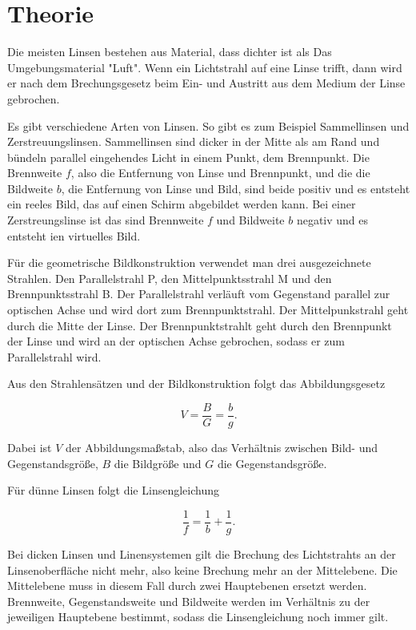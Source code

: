 \section{Theorie}
\label{sec:Theorie}

Die meisten Linsen bestehen aus Material, dass dichter ist als Das Umgebungsmaterial "Luft". Wenn ein Lichtstrahl auf eine Linse trifft, dann wird er nach dem Brechungsgesetz beim Ein- und Austritt aus dem Medium der Linse gebrochen. 

Es gibt verschiedene Arten von Linsen. So gibt es zum Beispiel Sammellinsen und Zerstreuungslinsen. Sammellinsen sind dicker in der Mitte als am Rand und bündeln parallel eingehendes Licht in einem Punkt, dem Brennpunkt. Die Brennweite $f$, also die Entfernung von Linse und Brennpunkt, und die die Bildweite $b$, die Entfernung von Linse und Bild, sind beide positiv und es entsteht ein reeles Bild, das auf einen Schirm abgebildet werden kann. Bei einer Zerstreungslinse ist das sind Brennweite $f$ und Bildweite $b$ negativ und es entsteht ien virtuelles Bild. 

Für die geometrische Bildkonstruktion verwendet man drei ausgezeichnete Strahlen. Den Parallelstrahl P, den Mittelpunktsstrahl M und den Brennpunktsstrahl B. 
Der Parallelstrahl verläuft vom Gegenstand parallel zur optischen Achse und wird dort zum Brennpunktstrahl. 
Der Mittelpunkstrahl geht durch die Mitte der Linse. 
Der Brennpunktstrahlt geht durch den Brennpunkt der Linse und wird an der optischen Achse gebrochen, sodass er zum Parallelstrahl wird. 

Aus den Strahlensätzen und der Bildkonstruktion folgt das Abbildungsgesetz 

\begin{equation}
    V = \frac{B}{G} = \frac{b}{g}.
    \label{eqn:abbildungsgesetz}
\end{equation}

Dabei ist $V$ der Abbildungsmaßstab, also das Verhältnis zwischen Bild- und Gegenstandsgröße, $B$ die Bildgröße und $G$ die Gegenstandsgröße.

Für dünne Linsen folgt die Linsengleichung 

\begin{equation}
    \frac{1}{f}= \frac{1}{b} + \frac{1}{g}.
    \label{eqn:linsengleichung}
\end{equation}

Bei dicken Linsen und Linensystemen gilt die Brechung des Lichtstrahts an der Linsenoberfläche nicht mehr, also keine Brechung mehr an der Mittelebene. Die Mittelebene muss in diesem Fall durch zwei Hauptebenen ersetzt werden. Brennweite, Gegenstandsweite und Bildweite werden im Verhältnis zu der jeweiligen Hauptebene bestimmt, sodass die Linsengleichung noch immer gilt. 

